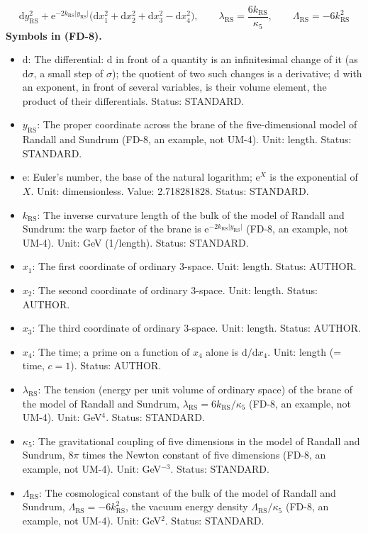 \documentclass[
  10pt,
]{article}
\providecommand{\tightlist}{%
  \setlength{\itemsep}{0pt}\setlength{\parskip}{0pt}}
\begin{document}
\[
\mathrm{d}y_{\mathrm{RS}}^2 + \mathrm{e}^{-2k_{\mathrm{RS}}\lvert y_{\mathrm{RS}}\rvert}\big(\mathrm{d}x_1^2 + \mathrm{d}x_2^2 + \mathrm{d}x_3^2
 - \mathrm{d}x_4^2\big),\qquad \lambda_{\mathrm{RS}} = \frac{6k_{\mathrm{RS}}}{\kappa_5},\qquad \Lambda_{\mathrm{RS}} = -6k_{\mathrm{RS}}^2 \tag{FD-8}
\] \textbf{Symbols in (FD-8).}

\begin{itemize}
\tightlist
\item
  \(\mathrm{d}\): The differential: \(\mathrm{d}\) in front of a
  quantity is an infinitesimal change of it (as \(\mathrm{d}\sigma\), a
  small step of \(\sigma\)); the quotient of two such changes is a
  derivative; \(\mathrm{d}\) with an exponent, in front of several
  variables, is their volume element, the product of their
  differentials. Status: STANDARD.
\item
  \(y_{\mathrm{RS}}\): The proper coordinate across the brane of the
  five-dimensional model of Randall and Sundrum (FD-8, an example, not
  UM-4). Unit: length. Status: STANDARD.
\item
  \(\mathrm{e}\): Euler's number, the base of the natural logarithm;
  \(\mathrm{e}^{X}\) is the exponential of \(X\). Unit: dimensionless.
  Value: 2.718281828. Status: STANDARD.
\item
  \(k_{\mathrm{RS}}\): The inverse curvature length of the bulk of the
  model of Randall and Sundrum: the warp factor of the brane is
  \(\mathrm{e}^{-2k_{\mathrm{RS}}\lvert y_{\mathrm{RS}}\rvert}\) (FD-8,
  an example, not UM-4). Unit: GeV (1/length). Status: STANDARD.
\item
  \(x_1\): The first coordinate of ordinary 3-space. Unit: length.
  Status: AUTHOR.
\item
  \(x_2\): The second coordinate of ordinary 3-space. Unit: length.
  Status: AUTHOR.
\item
  \(x_3\): The third coordinate of ordinary 3-space. Unit: length.
  Status: AUTHOR.
\item
  \(x_4\): The time; a prime on a function of \(x_4\) alone is
  \(\mathrm{d}/\mathrm{d}x_4\). Unit: length (= time, \(c = 1\)).
  Status: AUTHOR.
\item
  \(\lambda_{\mathrm{RS}}\): The tension (energy per unit volume of
  ordinary space) of the brane of the model of Randall and Sundrum,
  \(\lambda_{\mathrm{RS}} = 6k_{\mathrm{RS}}/\kappa_5\) (FD-8, an
  example, not UM-4). Unit: GeV\(^4\). Status: STANDARD.
\item
  \(\kappa_5\): The gravitational coupling of five dimensions in the
  model of Randall and Sundrum, \(8\pi\) times the Newton constant of
  five dimensions (FD-8, an example, not UM-4). Unit: GeV\(^{-3}\).
  Status: STANDARD.
\item
  \(\Lambda_{\mathrm{RS}}\): The cosmological constant of the bulk of
  the model of Randall and Sundrum,
  \(\Lambda_{\mathrm{RS}} = -6k_{\mathrm{RS}}^2\), the vacuum energy
  density \(\Lambda_{\mathrm{RS}}/\kappa_5\) (FD-8, an example, not
  UM-4). Unit: GeV\(^2\). Status: STANDARD.
\end{itemize}
\end{document}
